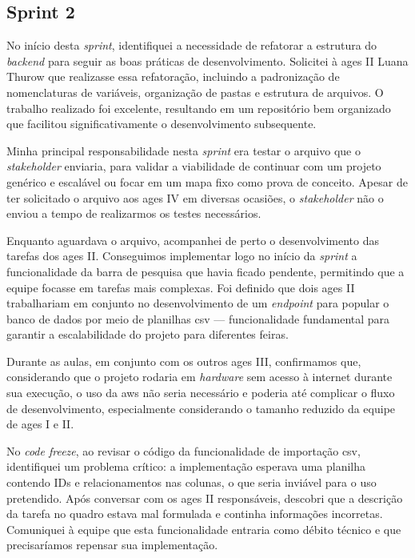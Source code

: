 \subsection{Sprint 2}

No início desta \textit{sprint}, identifiquei a necessidade de refatorar a estrutura do \textit{backend} para seguir as boas práticas de desenvolvimento. Solicitei à \ac{ages} II Luana Thurow que realizasse essa refatoração, incluindo a padronização de nomenclaturas de variáveis, organização de pastas e estrutura de arquivos. O trabalho realizado foi excelente, resultando em um repositório bem organizado que facilitou significativamente o desenvolvimento subsequente.

Minha principal responsabilidade nesta \textit{sprint} era testar o arquivo que o \textit{stakeholder} enviaria, para validar a viabilidade de continuar com um projeto genérico e escalável ou focar em um mapa fixo como prova de conceito. Apesar de ter solicitado o arquivo aos \ac{ages} IV em diversas ocasiões, o \textit{stakeholder} não o enviou a tempo de realizarmos os testes necessários.

Enquanto aguardava o arquivo, acompanhei de perto o desenvolvimento das tarefas dos \ac{ages} II. Conseguimos implementar logo no início da \textit{sprint} a funcionalidade da barra de pesquisa que havia ficado pendente, permitindo que a equipe focasse em tarefas mais complexas. Foi definido que dois \ac{ages} II trabalhariam em conjunto no desenvolvimento de um \textit{endpoint} para popular o banco de dados por meio de planilhas \ac{csv} --- funcionalidade fundamental para garantir a escalabilidade do projeto para diferentes feiras.

Durante as aulas, em conjunto com os outros \ac{ages} III, confirmamos que, considerando que o projeto rodaria em \textit{hardware} sem acesso à internet durante sua execução, o uso da \ac{aws} não seria necessário e poderia até complicar o fluxo de desenvolvimento, especialmente considerando o tamanho reduzido da equipe de \ac{ages} I e II.

No \textit{code freeze}, ao revisar o código da funcionalidade de importação \ac{csv}, identifiquei um problema crítico: a implementação esperava uma planilha contendo IDs e relacionamentos nas colunas, o que seria inviável para o uso pretendido. Após conversar com os \ac{ages} II responsáveis, descobri que a descrição da tarefa no quadro estava mal formulada e continha informações incorretas. Comuniquei à equipe que esta funcionalidade entraria como débito técnico e que precisaríamos repensar sua implementação.

